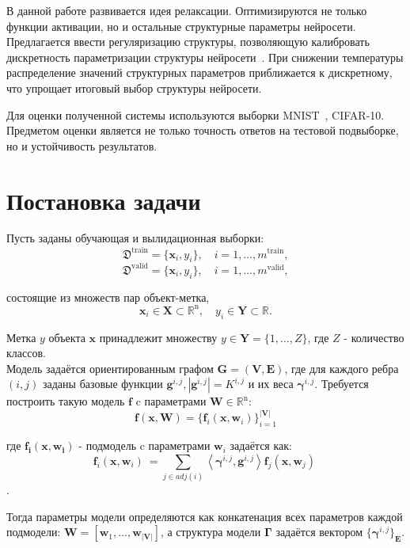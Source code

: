 \documentclass[12pt,twoside]{article}
\begin{document}
В данной работе развивается идея релаксации. Оптимизируются не только функции активации, но и остальные структурные параметры нейросети. Предлагается ввести регуляризацию структуры, позволяющую калибровать дискретность параметризации структуры нейросети~\cite{softmax}. При снижении температуры распределение значений структурных параметров приближается к дискретному, что упрощает итоговый выбор структуры нейросети. 

Для оценки полученной системы используются выборки MNIST~\cite{lecun-mnist}, CIFAR-10. Предметом оценки является не только точность ответов на тестовой подвыборке, но и устойчивость результатов.

\section{Постановка задачи}

Пусть заданы обучающая и вылидационная выборки:
\[
\mathfrak{D}^{\text{train}} = \{\mathbf{x}_i, y_i\}, \quad i=1,\dots,m^{\text{train}},
\]
\[
\mathfrak{D}^{\text{valid}} = \{\mathbf{x}_i, y_i\}, \quad i=1,\dots,m^{\text{valid}},
\]

состоящие из множеств пар объект-метка,
\[
\mathbf{x}_i\in\mathbf{X}\subset\mathbb{R}^{\text{n}},\quad y_i\in\mathbf{Y}\subset\mathbb{R}.
\] 

Метка $y$ объекта $\mathbf{x}$ принадлежит множеству $y\in\mathbf{Y}= \{1,\dots,Z\}$, где $Z$ - количество классов.
\\

Модель задаётся ориентированным графом $\mathbf{G=(V,E)}$, где для каждого ребра $(i,j)$ заданы базовые функции $\mathbf{g}^{i,j}, |\mathbf{g}^{i,j}| = K^{i,j}$ и их веса $\boldsymbol{\gamma}^{i,j}$. Требуется построить такую модель $\mathbf{f}$ c параметрами $\mathbf{W}\in\mathbb{R}^\text{n}$:
\[
\mathbf{f}(\mathbf{x}, \mathbf{W})= \{ \mathbf{f}_i(\mathbf{x}, \mathbf{w}_i)\}_{i=1}^\mathbf{|V|}
\]

где $\mathbf{f_i(x, w_i)}$ - подмодель c параметрами $\mathbf{w}_i$ задаётся как:
\[
\mathbf{f}_i(\mathbf{x}, \mathbf{w}_i)\ = \sum_{j\in adj(i)} \left\langle {\boldsymbol{\gamma}^{i,j}, \mathbf{g}^{i,j}} \right\rangle \mathbf{f}_j(\mathbf{x}, \mathbf{w}_j)\
\].

Тогда параметры модели определяются как конкатенация всех параметров каждой подмодели: $\mathbf{W}=[\mathbf{w}_1,\dots,\mathbf{w}_\mathbf{|V|}]$, а структура модели $\boldsymbol{\Gamma}$ задаётся вектором $\{ \boldsymbol{\gamma}^{i,j}\}_\mathbf{E}$.
\\
\end{document}
